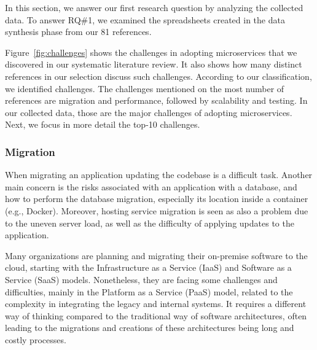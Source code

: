 In this section, we answer our first research question by analyzing the collected data.
To answer RQ\#1, we examined the spreadsheets created in the data synthesis phase from our 81 references.

Figure~\ref{fig:challenges} shows the challenges in adopting microservices that we discovered in our systematic literature review. It also shows how many distinct references in our selection discuss such challenges. 
According to our classification, we identified \challengecount challenges.
The challenges mentioned on the most number of references are migration and performance, followed by scalability and testing. In our collected data, those are the major challenges of adopting microservices. Next, we focus in more detail the top-10 challenges.


\subsubsection{Migration}%
When migrating an application updating the codebase is a difficult task.\cite{Tuuli2020, wang2020}
Another main concern is the risks associated with an application with a database, and how to perform the database migration, especially its location inside a container (e.g., Docker).
Moreover, hosting service migration is seen as also a problem due to the uneven server load, as well as the difficulty of applying updates to the application.\cite{Tuuli2020}

Many organizations are planning and migrating their on-premise software to the cloud, starting with the Infrastructure as a Service (IaaS) and Software as a Service (SaaS) models. Nonetheless, they are facing some challenges and difficulties, mainly in the Platform as a Service (PaaS) model, related to the complexity in integrating the legacy and internal systems.\cite{rosa2018} It requires a different way of thinking compared to the traditional way of software architectures, often leading to the migrations and creations of these architectures being long and costly processes.\cite{Leo2019}


